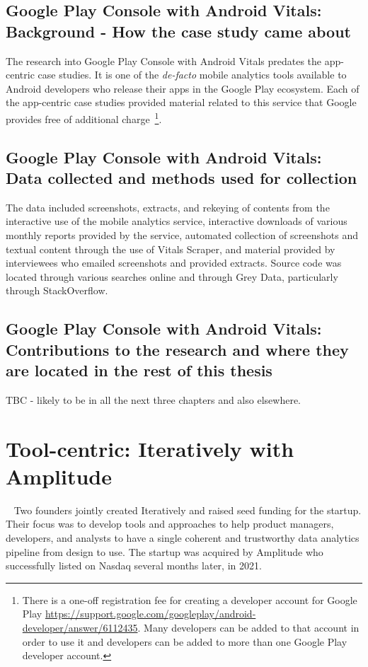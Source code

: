 \subsection{Google Play Console with Android Vitals: Background - How the case study came about}
The research into Google Play Console with Android Vitals predates the app-centric case studies. It is one of the \emph{de-facto} mobile analytics tools available to Android developers who release their apps in the Google Play ecosystem. Each of the app-centric case studies provided material related to this service that Google provides free of additional charge~\footnote{There is a one-off registration fee for creating a developer account for Google Play \url{https://support.google.com/googleplay/android-developer/answer/6112435}. Many developers can be added to that account in order to use it and developers can be added to more than one Google Play developer account.}.

\subsection{Google Play Console with Android Vitals: Data collected and methods used for collection}
The data included screenshots, extracts, and rekeying of contents from the interactive use of the mobile analytics service, interactive downloads of various monthly reports provided by the service, automated collection of screenshots and textual content through the use of Vitals Scraper, and material provided by interviewees who emailed screenshots and provided extracts. Source code was located through various searches online and through Grey Data, particularly through StackOverflow. 


\subsection{Google Play Console with Android Vitals: Contributions to the research and where they are located in the rest of this thesis}
TBC - likely to be in all the next three chapters and also elsewhere.




\section{Tool-centric: Iteratively with Amplitude}~\label{case-study-overview-iteratively-with-amplitude}
Two founders jointly created Iteratively and raised seed funding for the startup. Their focus was to develop tools and approaches to help product managers, developers, and analysts to have a single coherent and trustworthy data analytics pipeline from design to use. The startup was acquired by Amplitude who successfully listed on Nasdaq several months later, in 2021. 

